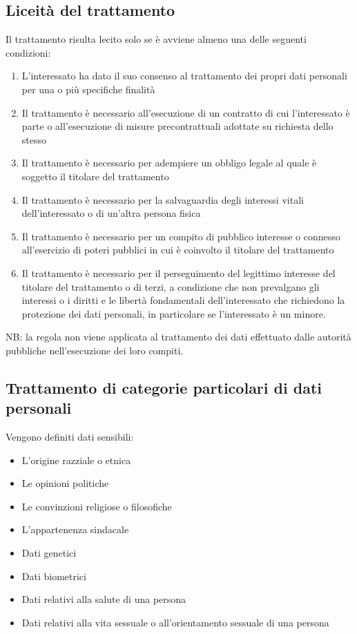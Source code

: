 \subsection{Liceità del trattamento}
Il trattamento risulta lecito solo se è avviene almeno una delle seguenti condizioni:
\begin{enumerate}
    \item L'interessato ha dato il suo consenso al trattamento dei propri dati personali per una o più specifiche finalità
    \item Il trattamento è necessario all'esecuzione di un contratto di cui l'interessato è parte o all'esecuzione di misure precontrattuali adottate su richiesta dello stesso

    \item Il trattamento è necessario per adempiere un obbligo legale al quale è soggetto il titolare del trattamento

    \item Il trattamento è necessario per la salvaguardia degli interessi vitali dell'interessato o di un'altra persona fisica

    \item Il trattamento è necessario per un compito di pubblico interesse o connesso all'esercizio di poteri pubblici in cui è coinvolto il titolare del trattamento

    \item Il trattamento è necessario per il perseguimento del legittimo interesse del titolare del trattamento o di terzi, a condizione che non prevalgano gli interessi o i diritti e le libertà fondamentali dell'interessato che richiedono la protezione dei dati personali, in particolare se l'interessato è un minore.

\end{enumerate}
NB: la regola non viene applicata al trattamento dei dati effettuato dalle autorità pubbliche nell'esecuzione dei loro compiti.

\subsection{Trattamento di categorie particolari di dati personali}

Vengono definiti dati sensibili:
\begin{itemize}
    \item L'origine razziale o etnica
    \item Le opinioni politiche
    \item Le convinzioni religiose o filosofiche
    \item L'appartenenza sindacale
    \item Dati genetici
    \item Dati biometrici
    \item Dati relativi alla salute di una persona
    \item Dati relativi alla vita sessuale o all'orientamento sessuale di una persona

\end{itemize}

